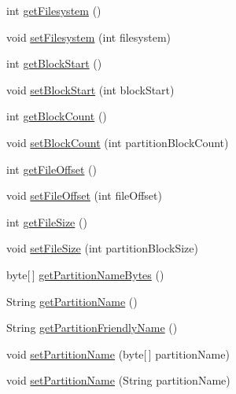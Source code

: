 \begin{DoxyCompactItemize}
\item 
int \hyperlink{classcom_1_1casual__dev_1_1libpitX_1_1PitEntry_a14c2a17a34d7a856841c6d4f6a7faa55}{get\-Filesystem} ()
\item 
void \hyperlink{classcom_1_1casual__dev_1_1libpitX_1_1PitEntry_af8dcf52b2891cebde21141fe14825776}{set\-Filesystem} (int filesystem)
\item 
int \hyperlink{classcom_1_1casual__dev_1_1libpitX_1_1PitEntry_a31268b095a9c0bea62546eb89e52e83c}{get\-Block\-Start} ()
\item 
void \hyperlink{classcom_1_1casual__dev_1_1libpitX_1_1PitEntry_ab251367b41dd114c583fd07fce2a9c90}{set\-Block\-Start} (int block\-Start)
\item 
int \hyperlink{classcom_1_1casual__dev_1_1libpitX_1_1PitEntry_ab9f5ff4767d583453c99e6e72e8c47ad}{get\-Block\-Count} ()
\item 
void \hyperlink{classcom_1_1casual__dev_1_1libpitX_1_1PitEntry_a5103dd7f83f10db5d62412552ee8190f}{set\-Block\-Count} (int partition\-Block\-Count)
\item 
int \hyperlink{classcom_1_1casual__dev_1_1libpitX_1_1PitEntry_a568044efde68e55a58325f462c97ef71}{get\-File\-Offset} ()
\item 
void \hyperlink{classcom_1_1casual__dev_1_1libpitX_1_1PitEntry_ab5963fd6545122217f0705a2a6437c35}{set\-File\-Offset} (int file\-Offset)
\item 
int \hyperlink{classcom_1_1casual__dev_1_1libpitX_1_1PitEntry_a7cb4a7951dffef12cded2030f869ee35}{get\-File\-Size} ()
\item 
void \hyperlink{classcom_1_1casual__dev_1_1libpitX_1_1PitEntry_a0697b3bdb48274d6144e312655e303b4}{set\-File\-Size} (int partition\-Block\-Size)
\item 
byte\mbox{[}$\,$\mbox{]} \hyperlink{classcom_1_1casual__dev_1_1libpitX_1_1PitEntry_a424a14c5faa950f434360a9bc764fb94}{get\-Partition\-Name\-Bytes} ()
\item 
String \hyperlink{classcom_1_1casual__dev_1_1libpitX_1_1PitEntry_a19559e3e0fc28faa5969beb25b605a5e}{get\-Partition\-Name} ()
\item 
String \hyperlink{classcom_1_1casual__dev_1_1libpitX_1_1PitEntry_a2974f9a871aeefec19fbe7416c324249}{get\-Partition\-Friendly\-Name} ()
\item 
void \hyperlink{classcom_1_1casual__dev_1_1libpitX_1_1PitEntry_a94a1e4368f5f81cd0ac9c51a3dfaca02}{set\-Partition\-Name} (byte\mbox{[}$\,$\mbox{]} partition\-Name)
\item 
void \hyperlink{classcom_1_1casual__dev_1_1libpitX_1_1PitEntry_af77c18bae0d84764daba7497723383a7}{set\-Partition\-Name} (String partition\-Name)

\end{DoxyCompactItemize}
